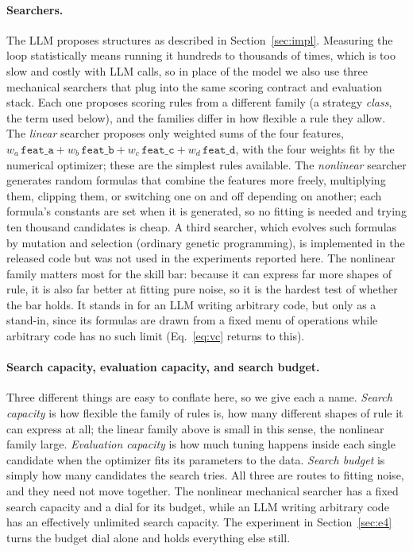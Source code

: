\documentclass[11pt]{article}
\newcommand{\code}[1]{\texttt{#1}}
\begin{document}
\paragraph{Searchers.} The LLM proposes structures as described in Section~\ref{sec:impl}. Measuring the
loop statistically means running it hundreds to thousands of times, which is too slow and costly with
LLM calls, so in place of the model we also use three mechanical searchers that plug into the same
scoring contract and evaluation stack. Each one proposes scoring rules from a different family (a
strategy \emph{class}, the term used below), and the families differ in how flexible a rule they allow.
The \emph{linear} searcher proposes only weighted sums of the four features,
$w_a\,\code{feat\_a}+w_b\,\code{feat\_b}+w_c\,\code{feat\_c}+w_d\,\code{feat\_d}$, with the four weights
fit by the numerical optimizer; these are the simplest rules available. The \emph{nonlinear} searcher
generates random formulas that combine the features more freely, multiplying them, clipping them, or
switching one on and off depending on another; each formula's constants are set when it is generated, so
no fitting is needed and trying ten thousand candidates is cheap. A third searcher, which evolves such
formulas by mutation and selection (ordinary genetic programming), is implemented in the released code
but was not used in the experiments reported here. The nonlinear family matters most for the skill
bar: because it can express far more shapes of rule, it is also far better at fitting pure noise, so it
is the hardest test of whether the bar holds. It stands in for an LLM writing arbitrary code, but only as
a stand-in, since its formulas are drawn from a fixed menu of operations while arbitrary code has no such
limit (Eq.~\eqref{eq:vc} returns to this).

\paragraph{Search capacity, evaluation capacity, and search budget.} Three different things are easy to conflate here, so we give
each a name. \emph{Search capacity} is how flexible the family of rules is, how many different shapes of
rule it can express at all; the linear family above is small in this sense, the nonlinear family large.
\emph{Evaluation capacity} is how much tuning happens inside each single candidate when the optimizer
fits its parameters to the data. \emph{Search budget} is simply how many candidates the search tries.
All three are routes to fitting noise, and they need not move together. The nonlinear mechanical searcher
has a fixed search capacity and a dial for its budget, while an LLM writing arbitrary code has an
effectively unlimited search capacity. The experiment in Section~\ref{sec:e4} turns the budget dial
alone and holds everything else still.
\end{document}
